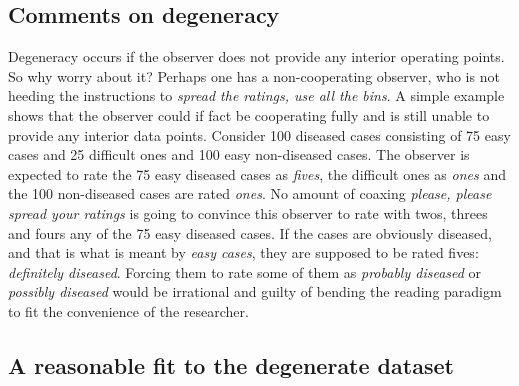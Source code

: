 \documentclass[
]{book}
\begin{document}
\hypertarget{binormal-model-comments}{%
\subsection{Comments on degeneracy}\label{binormal-model-comments}}

Degeneracy occurs if the observer does not provide any interior operating points. So why worry about it? Perhaps one has a non-cooperating observer, who is not heeding the instructions to \emph{spread the ratings, use all the bins}. A simple example shows that the observer could if fact be cooperating fully and is still unable to provide any interior data points. Consider 100 diseased cases consisting of 75 easy cases and 25 difficult ones and 100 easy non-diseased cases. The observer is expected to rate the 75 easy diseased cases as \emph{fives}, the difficult ones as \emph{ones} and the 100 non-diseased cases are rated \emph{ones}. No amount of coaxing \emph{please, please spread your ratings} is going to convince this observer to rate with twos, threes and fours any of the 75 easy diseased cases. If the cases are obviously diseased, and that is what is meant by \emph{easy cases}, they are supposed to be rated fives: \emph{definitely diseased}. Forcing them to rate some of them as \emph{probably diseased} or \emph{possibly diseased} would be irrational and guilty of bending the reading paradigm to fit the convenience of the researcher.

\hypertarget{binormal-model-reasonable-fit}{%
\subsection{A reasonable fit to the degenerate dataset}\label{binormal-model-reasonable-fit}}
\end{document}
